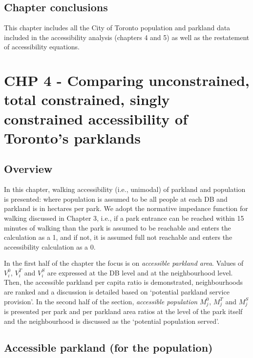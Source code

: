 \documentclass[
11pt, %
oneside, %
english, %
singlespacing, %
]{macthesis} %
\begin{document}
\section{Chapter conclusions}\label{chapter-conclusions-1}

This chapter includes all the City of Toronto population and parkland data included in the accessibility analysis (chapters 4 and 5) as well as the restatement of accessibility equations.

\chapter{CHP 4 - Comparing unconstrained, total constrained, singly constrained accessibility of Toronto's parklands}\label{chp-4---comparing-unconstrained-total-constrained-singly-constrained-accessibility-of-torontos-parklands}

\section{Overview}\label{overview-3}

In this chapter, walking accessibility (i.e., unimodal) of parkland and population is presented: where population is assumed to be all people at each DB and parkland is in hectares per park. We adopt the normative impedance function for walking discussed in Chapter 3, i.e., if a park entrance can be reached within 15 minutes of walking than the park is assumed to be reachable and enters the calculation as a 1, and if not, it is assumed full not reachable and enters the accessibility calculation as a 0.

In the first half of the chapter the focus is on \emph{accessible parkland area}. Values of \(V^0_i\), \(V^T_i\) and \(V^S_i\) are expressed at the DB level and at the neighbourhood level. Then, the accessible parkland per capita ratio is demonstrated, neighbourhoods are ranked and a discussion is detailed based on `potential parkland service provision'. In the second half of the section, \emph{accessible population} \(M^0_j\), \(M^T_j\) and \(M^S_j\) is presented per park and per parkland area ratios at the level of the park itself and the neighbourhood is discussed as the `potential population served'.

\section{Accessible parkland (for the population)}\label{accessible-parkland-for-the-population}
\end{document}
